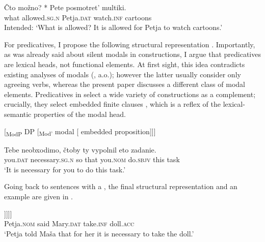 \documentclass[output=paper,colorlinks,citecolor=brown,newtxmath]{langsci/langscibook}
\begin{document}
\ea \label{ex23}
\gll Čto možno? *\hspace{-2pt} Pete posmotret’ multiki.\\
    what allowed.\textsc{sg.n} {} Petja.\textsc{dat} watch.\textsc{inf} cartoons\\
\glt Intended: `What is allowed? It is allowed for Petja to watch cartoons.'
\z

\noindent For  predicatives, I propose the following structural representation . Importantly, as was already said about silent modals in  constructions, I argue that  predicatives are lexical heads, not functional elements. At first sight, this idea contradicts existing analyses of modals (\citealt{cinque1999,W1999}, a.o.); however the latter usually consider only  agreeing verbs, whereas the present paper discusses a different class of modal elements. Predicatives in  select a wide variety of constructions as a complement; crucially, they select embedded finite  clauses , which is a reflex of the lexical-semantic properties of the modal head.

\begin{exe}
\ex\label{ex24}
{[\textsubscript{ModP} DP [\textsubscript{Mod$’$} modal [\hspace{-2pt} embedded proposition]]]}
\end{exe}

\ea\label{ex25}
\gll Tebe neobxodimo, čtoby ty vypolnil eto zadanie.\\
    you.\textsc{dat} necessary.\textsc{sg.n} {so that} you.\textsc{nom} do.\textsc{sbjv} this task\\
\glt `It is necessary for you to do this task.'
\z

\noindent Going back to sentences with a , the final structural representation and an example are given in .

\ea\label{ex26}
\gll [\textsubscript{\textit{v}P} Petja [\textsubscript{VP} [\textsubscript{V} skazal][\textsubscript{ModP} [\hspace{-2pt} Maše$_i$ ][\textsubscript{Mod$'$} modal [\textsubscript{CP} PRO$_i$ vzjat’ kuklu ]]]]]\\
    {}  Petja.\textsc{nom}   {}  {}  said {} Mary.\textsc{dat}  {} {}  {}  {}  take.\textsc{inf}    doll.\textsc{acc} {}\\
\glt `Petja told Maša that for her it is necessary to take the doll.'
\z
\end{document}
